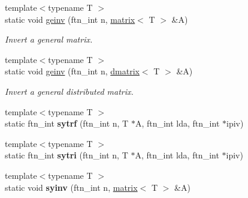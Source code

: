 \begin{DoxyCompactItemize}
\item 
{\footnotesize template$<$typename T $>$ }\\static void \hyperlink{classsddk_1_1linalg_3_01_c_p_u_01_4_a73b3f5e2eda7f33763e1cffce538a655}{geinv} (ftn\+\_\+int n, \hyperlink{classsddk_1_1mdarray}{matrix}$<$ T $>$ \&A)
\begin{DoxyCompactList}\small\item\em Invert a general matrix. \end{DoxyCompactList}\item 
{\footnotesize template$<$typename T $>$ }\\static void \hyperlink{classsddk_1_1linalg_3_01_c_p_u_01_4_a48500621361a850ad037cb4079a6373f}{geinv} (ftn\+\_\+int n, \hyperlink{classsddk_1_1dmatrix}{dmatrix}$<$ T $>$ \&A)
\begin{DoxyCompactList}\small\item\em Invert a general distributed matrix. \end{DoxyCompactList}\item 
\hypertarget{classsddk_1_1linalg_3_01_c_p_u_01_4_ab37af5f08a2d2848de7a5573b9526155}{}{\footnotesize template$<$typename T $>$ }\\static ftn\+\_\+int {\bfseries sytrf} (ftn\+\_\+int n, T $\ast$A, ftn\+\_\+int lda, ftn\+\_\+int $\ast$ipiv)\label{classsddk_1_1linalg_3_01_c_p_u_01_4_ab37af5f08a2d2848de7a5573b9526155}

\item 
\hypertarget{classsddk_1_1linalg_3_01_c_p_u_01_4_a41f216bf31f77cbd82ef1726143bb81d}{}{\footnotesize template$<$typename T $>$ }\\static ftn\+\_\+int {\bfseries sytri} (ftn\+\_\+int n, T $\ast$A, ftn\+\_\+int lda, ftn\+\_\+int $\ast$ipiv)\label{classsddk_1_1linalg_3_01_c_p_u_01_4_a41f216bf31f77cbd82ef1726143bb81d}

\item 
\hypertarget{classsddk_1_1linalg_3_01_c_p_u_01_4_a0b2603139b3386f1bbe1c8480c486aed}{}{\footnotesize template$<$typename T $>$ }\\static void {\bfseries syinv} (ftn\+\_\+int n, \hyperlink{classsddk_1_1mdarray}{matrix}$<$ T $>$ \&A)\label{classsddk_1_1linalg_3_01_c_p_u_01_4_a0b2603139b3386f1bbe1c8480c486aed}


\end{DoxyCompactItemize}
